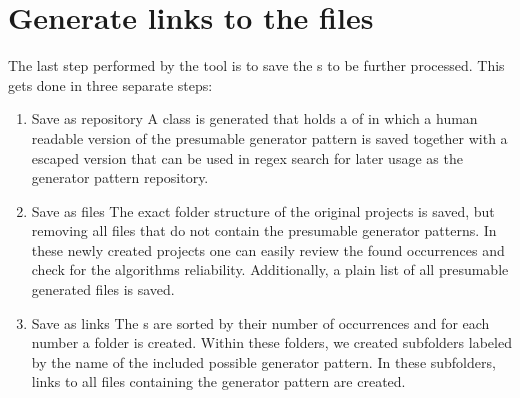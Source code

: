 \section{Generate links to the files}
The last step performed by the tool is to save the s to be further processed. This gets done in three separate steps:
\begin{enumerate}
	\item Save as repository
		\subitem A  class is generated that holds a  of  in which a human readable version of the presumable generator pattern is saved together with a escaped version that can be used in regex search for later usage as the generator pattern repository.
	\item Save as files
		\subitem The exact folder structure of the original projects is saved, but removing all files that do not contain the presumable generator patterns. In these newly created projects one can easily review the found occurrences and check for the algorithms reliability. Additionally, a plain  list of all presumable generated files is saved.
	\item Save as links
		\subitem The s are sorted by their number of occurrences and for each number a folder is created. Within these folders, we created subfolders labeled by the name of the included possible generator pattern. In these subfolders, links to all files containing the generator pattern are created.
\end{enumerate} 

